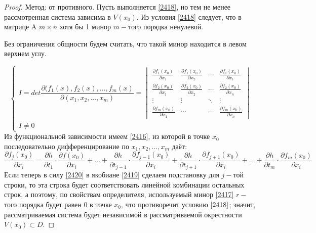 \begin{proof}
    Метод: от противного. Пусть выполняется \eqref{2418}, но тем не менее рассмотренная система зависима в $V(x_0)$. Из условия \eqref{2418} следует, что в матрице A $m \times n$ хотя бы 1 минор $m-$того порядка ненулевой.
    
    Без ограничения общности будем считать, что такой минор находится в левом верхнем углу.
    
    \begin{equation}
    \label{2419}
    \begin{cases}
    I = det \dfrac{\partial (f_1(x), f_2(x), \ldots, f_m(x)}{\partial (x_1, x_2, \ldots, x_m)} =  \begin{vmatrix}
    \frac{\partial f_1(x_0)}{\partial x_1} & \frac{\partial f_1(x_0)}{\partial x_2} & \cdots & \frac{\partial f_1(x_0)}{\partial x_1} \\
    \frac{\partial f_2(x_0)}{\partial x_1} & \frac{\partial f_2(x_0)}{\partial x_2} & \cdots & \frac{\partial f_2(x_0)}{\partial x_n} \\
    \vdots  & \vdots  & \ddots & \vdots  \\
    \frac{\partial f_m(x_0)}{\partial x_1} & \cdots & \cdots &\frac{\partial f_m(x_0)}{\partial x_n}
    \end{vmatrix} \\
    I \ne 0
    \end{cases}
    \end{equation}
    Из функциональной зависимости имеем \eqref{2416}, из которой в точке $x_0$ последовательно дифференцирование по $x_1, x_2, \ldots, x_m$ даёт:
    \begin{equation}
    \label{2420}
    \dfrac{\partial f_j(x_0)}{\partial x_i} = \dfrac{\partial h}{\partial t_1} \cdot \dfrac{\partial f(x_0)}{\partial x_i} + \ldots + \dfrac{\partial h}{\partial t_{j-1}} \cdot \dfrac{\partial f_{j-1}(x_0)}{\partial x_i} + \dfrac{\partial h}{\partial t_{j+1}} \cdot \dfrac{\partial f_{j+1}(x_0)}{\partial x_i} + \ldots + \dfrac{\partial h}{\partial t_m} \cdot \dfrac{\partial f_m(x_0)}{\partial x_i}
    \end{equation}
    Если теперь в силу \eqref{2420} в якобиане \eqref{2419} сделаем подстановку для $j-$той строки, то эта строка будет соответствовать линейной комбинации остальных строк, а поэтому, по свойствам определителя, используемый минор \eqref{2417} $r-$того порядка будет равен 0 в точке $x_0$, что противоречит условию $\eqref{2418}$; значит, рассматриваемая система будет независимой в рассматриваемой окрестности 	$V(x_0) \subset D$.
\end{proof}
